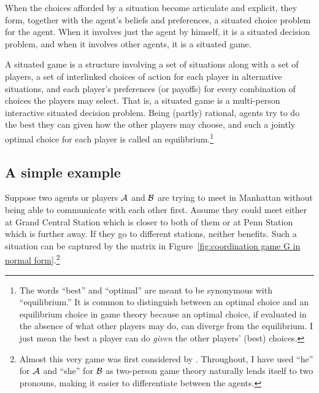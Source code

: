 When the choices afforded by a situation become articulate and explicit, they form, together with the agent's beliefs and preferences, a situated choice problem for the agent. When it involves just the agent by himself, it is a situated decision problem, and when it involves other agents, it is a situated game.

A situated game is a structure involving a set of situations along with a set of players, a set of interlinked choices of action for each player in alternative situations, and each player's preferences (or payoffs) for every combination of choices the players may select. That is, a situated game is a multi-person interactive situated decision problem. Being (partly) rational, agents try to do the best they can given how the other players may choose, and such a jointly optimal choice for each player is called an equilibrium.\footnote{The words ``best'' and ``optimal'' are meant to be synonymous with ``equilibrium.'' It is common to distinguish between an optimal choice and an equilibrium choice in game theory because an optimal choice, if evaluated in the absence of what other players may do, can diverge from the equilibrium. I just mean the best a player can do \emph{given} the other players' (best) choices.\label{foot:optimal}}


\subsection{A simple example}

Suppose two agents or players $\cal A$ and $\cal B$ are trying to meet in Manhattan without being able to communicate with each other first. Assume they could meet either at Grand Central Station which is closer to both of them or at Penn Station which is further away. If they go to different stations, neither benefits. Such a situation can be captured by the matrix in Figure~\ref{fig:coordination game G in normal form}.\footnote{Almost this very game was first considered by \citet{schelling:sc}. Throughout, I have used ``he'' for $\cal A$ and ``she'' for $\cal B$ as two-person game theory naturally lends itself to two pronouns, making it easier to differentiate between the agents.}

